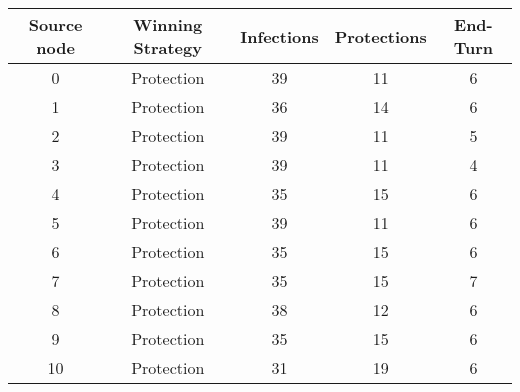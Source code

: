 \documentclass[results.tex]{subfiles}
\begin{document}
    \begin{center}
        \begin{tabular}{| c || c | c | c | c |}
            \hline
            {\bfseries Source node} & {\bfseries Winning Strategy} & {\bfseries Infections} & {\bfseries Protections}
            & {\bfseries End-Turn}
            \\  %
            \hline\hline
            0                       & Protection                   & 39                     & 11                      & 6                    \\
            \hline
            1                       & Protection                   & 36                     & 14                      & 6                    \\
            \hline
            2                       & Protection                   & 39                     & 11                      & 5                    \\
            \hline
            3                       & Protection                   & 39                     & 11                      & 4                    \\
            \hline
            4                       & Protection                   & 35                     & 15                      & 6                    \\
            \hline
            5                       & Protection                   & 39                     & 11                      & 6                    \\
            \hline
            6                       & Protection                   & 35                     & 15                      & 6                    \\
            \hline
            7                       & Protection                   & 35                     & 15                      & 7                    \\
            \hline
            8                       & Protection                   & 38                     & 12                      & 6                    \\
            \hline
            9                       & Protection                   & 35                     & 15                      & 6                    \\
            \hline
            10                      & Protection                   & 31                     & 19                      & 6                    \\

\end{tabular}
\end{center}
\end{document}
